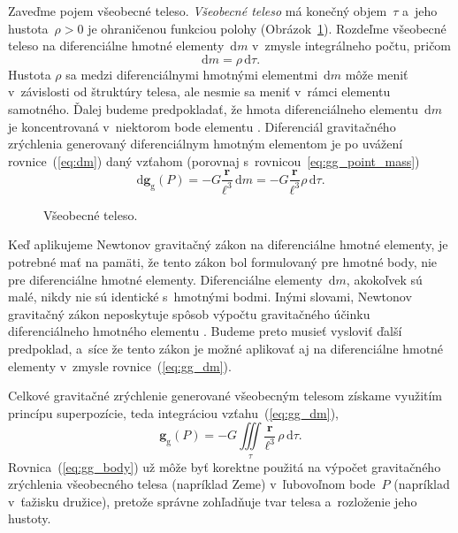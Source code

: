 \documentclass[a4paper, 12pt]{book}
\newcommand{\diff}{\mathrm d}
\newcommand{\gidx}{\mathrm g}
\let\vec\mathbf
\begin{document}
Zaveďme pojem všeobecné teleso.  \emph{Všeobecné teleso} má konečný 
objem~$\tau$ a~jeho hustota~$\rho > 0$ je ohraničenou funkciou polohy 
(Obrázok~\ref{fig:gravitating_body}).  Rozdeľme všeobecné teleso na 
diferenciálne hmotné elementy~$\diff m$ v~zmysle integrálneho počtu, pričom
%
\begin{equation}
\label{eq:dm}
\diff m = \rho \, \diff \tau{.}
\end{equation}
%
Hustota $\rho$ sa medzi diferenciálnymi hmotnými elementmi~$\diff m$ môže meniť 
v~závislosti od štruktúry telesa, ale nesmie sa meniť v~rámci elementu 
samotného.  Ďalej budeme predpokladať, že hmota diferenciálneho elementu~$\diff 
m$ je koncentrovaná v~niektorom bode elementu \parencite{Kellogg1967}.  
Diferenciál gravitačného zrýchlenia generovaný diferenciálnym hmotným elementom 
je po uvážení rovnice~(\ref{eq:dm}) daný vzťahom (porovnaj 
s~rovnicou~\ref{eq:gg_point_mass})
%
\begin{equation}
\label{eq:gg_dm}
\diff \vec g_\gidx(P) = -G \frac{\vec r}{\ell^3} \, \diff m = -G \frac{\vec 
r}{\ell^3} \rho \, \diff\tau{.}
\end{equation}

\begin{figure}
\centering

\caption{Všeobecné teleso.}
\label{fig:gravitating_body}
\end{figure}

Keď aplikujeme Newtonov gravitačný zákon na diferenciálne hmotné elementy, je 
potrebné mať na pamäti, že tento zákon bol formulovaný pre hmotné body, nie pre 
diferenciálne hmotné elementy.  Diferenciálne elementy~$\diff m$, akokoľvek sú 
malé, nikdy nie sú identické s~hmotnými bodmi.  Inými slovami, Newtonov 
gravitačný zákon neposkytuje spôsob výpočtu gravitačného účinku diferenciálneho 
hmotného elementu \parencite{Kellogg1967}.  Budeme preto musieť vysloviť ďalší 
predpoklad, a~síce že tento zákon je možné aplikovať aj na diferenciálne hmotné 
elementy v~zmysle rovnice~(\ref{eq:gg_dm}).

Celkové gravitačné zrýchlenie generované všeobecným telesom získame
využitím princípu superpozície, teda integráciou vzťahu~(\ref{eq:gg_dm}),
%
\begin{equation}
\label{eq:gg_body}
\vec g_\gidx(P) = -G \iiint\limits_{\tau} \frac{\vec r}{\ell^3} \, \rho \, 
\diff\tau{.}
\end{equation}
%
Rovnica~(\ref{eq:gg_body}) už môže byť korektne použitá na výpočet gravitačného 
zrýchlenia všeobecného telesa (napríklad Zeme) v~ľubovoľnom bode~$P$ (napríklad 
v~ťažisku družice), pretože správne zohľadňuje tvar telesa a~rozloženie jeho 
hustoty.
\end{document}
